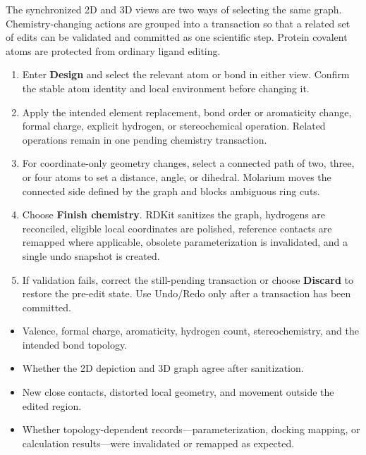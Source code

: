 
The synchronized 2D and 3D views are two ways of selecting the same graph. Chemistry-changing actions are grouped into a transaction so that a related set of edits can be validated and committed as one scientific step. Protein covalent atoms are protected from ordinary ligand editing.


\begin{enumerate}
\item Enter \textbf{Design} and select the relevant atom or bond in either view. Confirm the stable atom identity and local environment before changing it.
\item Apply the intended element replacement, bond order or aromaticity change, formal charge, explicit hydrogen, or stereochemical operation. Related operations remain in one pending chemistry transaction.
\item For coordinate-only geometry changes, select a connected path of two, three, or four atoms to set a distance, angle, or dihedral. Molarium moves the connected side defined by the graph and blocks ambiguous ring cuts.
\item Choose \textbf{Finish chemistry}. RDKit sanitizes the graph, hydrogens are reconciled, eligible local coordinates are polished, reference contacts are remapped where applicable, obsolete parameterization is invalidated, and a single undo snapshot is created.
\item If validation fails, correct the still-pending transaction or choose \textbf{Discard} to restore the pre-edit state. Use Undo/Redo only after a transaction has been committed.
\end{enumerate}


\begin{itemize}
\item Valence, formal charge, aromaticity, hydrogen count, stereochemistry, and the intended bond topology.
\item Whether the 2D depiction and 3D graph agree after sanitization.
\item New close contacts, distorted local geometry, and movement outside the edited region.
\item Whether topology-dependent records---parameterization, docking mapping, or calculation results---were invalidated or remapped as expected.
\end{itemize}

